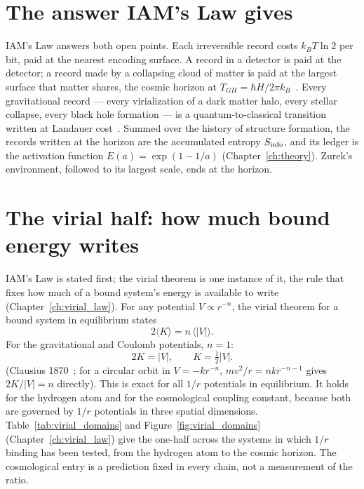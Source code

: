 \section{The answer IAM's Law gives}\label{sec:qr_answer}
IAM's Law answers both open points. Each irreversible record costs $k_BT\ln2$ per bit, paid at the nearest encoding surface. A record in a detector is
paid at the detector; a record made by a collapsing cloud of matter is paid at the largest surface that matter shares, the cosmic horizon at
$T_{GH}=\hbar H/2\pi k_B$~\cite{GibbonsHawking1977}. Every gravitational record --- every virialization of a dark matter halo, every stellar collapse,
every black hole formation --- is a quantum-to-classical transition written at Landauer cost~\cite{Landauer1961}. Summed over the history of structure
formation, the records written at the horizon are the accumulated entropy $S_{\rm info}$, and its ledger is the activation function $E(a)=\exp(1-1/a)$
(Chapter~\ref{ch:theory}). Zurek's environment, followed to its largest scale, ends at the horizon. \interp

\section{The virial half: how much bound energy writes}\label{sec:qr_virial}
IAM's Law is stated first; the virial theorem is one instance of it, the rule that fixes how much of a bound system's energy is available to write
(Chapter~\ref{ch:virial_law}). For any potential $V\propto r^{-n}$, the virial theorem for a bound system in equilibrium states
\begin{equation}
2\langle K\rangle=n\,\langle|V|\rangle .\label{eq:qr_virial_n}
\end{equation}
For the gravitational and Coulomb potentials, $n=1$:
\begin{equation}
2K=|V|,\qquad K=\tfrac12|V| .\label{eq:qr_virial_1}
\end{equation}
\derived{} (Clausius 1870~\cite{Clausius1870}; for a circular orbit in $V=-kr^{-n}$, $mv^2/r=nkr^{-n-1}$ gives $2K/|V|=n$ directly). This is exact for
all $1/r$ potentials in equilibrium. It holds for the hydrogen atom and for the cosmological coupling constant, because both are governed by $1/r$
potentials in three spatial dimensions. Table~\ref{tab:virial_domains} and Figure~\ref{fig:virial_domains} (Chapter~\ref{ch:virial_law}) give the
one-half across the systems in which $1/r$ binding has been tested, from the hydrogen atom to the cosmic horizon. The cosmological entry is a prediction
fixed in every chain, not a measurement of the ratio.

